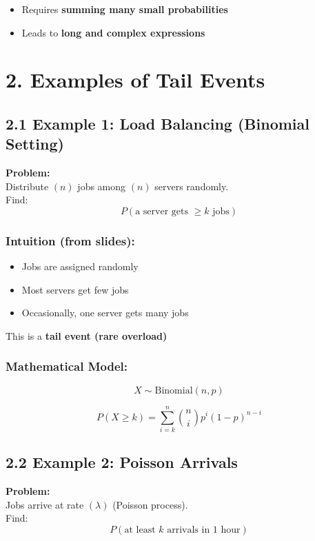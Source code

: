 \documentclass[12pt]{article}
\begin{document}
\begin{itemize}
\item Requires \textbf{summing many small probabilities}
\item Leads to \textbf{long and complex expressions} 
\end{itemize}

\section*{2. Examples of Tail Events}

\subsection*{2.1 Example 1: Load Balancing (Binomial Setting)}

\textbf{Problem:} \\
Distribute $(n)$ jobs among $(n)$ servers randomly. \\
Find:
\[
P(\text{a server gets } \ge k \text{ jobs})
\]

\subsubsection*{Intuition (from slides):}

\begin{itemize}
\item Jobs are assigned randomly
\item Most servers get few jobs
\item Occasionally, one server gets many jobs
\end{itemize}

This is a \textbf{tail event (rare overload)} 

\subsubsection*{Mathematical Model:}

\[
X \sim \text{Binomial}(n, p)
\]

\[
P(X \ge k) = \sum_{i=k}^{n} \binom{n}{i} p^i (1-p)^{n-i}
\]

\subsection*{2.2 Example 2: Poisson Arrivals}

\textbf{Problem:} \\
Jobs arrive at rate $(\lambda)$ (Poisson process). \\
Find:
\[
P(\text{at least } k \text{ arrivals in 1 hour})
\]
\end{document}
